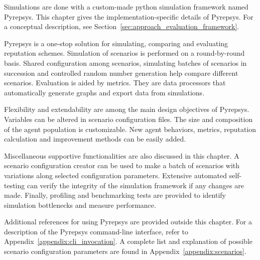 \documentclass[%
    ]{\PathToTumTemplate/thesis/tum_thesis}
\begin{document}
Simulations are done with a custom-made python simulation framework named Pyrepsys.
This chapter gives the implementation-specific details of Pyrepsys. 
For a conceptual description, see Section~\ref{sec:approach_evaluation_framework}.

Pyrepsys is a one-stop solution for simulating, comparing and evaluating reputation schemes.
Simulation of scenarios is performed on a round-by-round basis.
Shared configuration among scenarios, simulating batches of scenarios in succession and controlled random number generation help compare different scenarios.
Evaluation is aided by metrics.
They are data processors that automatically generate graphs and export data from simulations.

Flexibility and extendability are among the main design objectives of Pyrepsys.
Variables can be altered in scenario configuration files.
The size and composition of the agent population is customizable.
New agent behaviors, metrics, reputation calculation and improvement methods can be easily added.

Miscellaneous supportive functionalities are also discussed in this chapter.
A scenario configuration creator can be used to make a batch of scenarios with variations along selected configuration parameters.
Extensive automated self-testing can verify the integrity of the simulation framework if any changes are made.
Finally, profiling and benchmarking tests are provided to identify simulation bottlenecks and measure performance.

Additional references for using Pyrepsys are provided outside this chapter.
For a description of the Pyrepsys command-line interface, refer to Appendix~\ref{appendix:cli_invocation}.
A complete list and explanation of possible scenario configuration parameters are found in Appendix~\ref{appendix:scenarios}.

\end{document}
